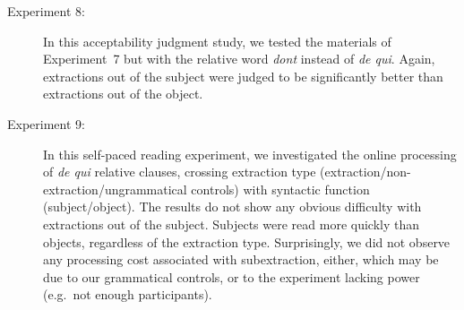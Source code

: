 \begin{description}
\item[Experiment 8:] In this acceptability judgment study, we tested the materials of Experiment~7 but with the relative word \emph{dont} instead of \emph{de qui}. Again, extractions out of the subject were judged to be significantly better than extractions out of the object.

\item[Experiment 9:] In this self-paced reading experiment, we investigated the online processing of \emph{de qui} relative clauses, crossing extraction type (extraction\slash non-extraction\slash ungrammatical controls) with syntactic function (subject\slash object). The results do not show any obvious difficulty with extractions out of the subject. Subjects were read more quickly than objects, regardless of the extraction type. Surprisingly, we did not observe any processing cost associated with subextraction, either, which may be due to our grammatical controls, or to the experiment lacking power (e.g.\ not enough participants).

\end{description}
